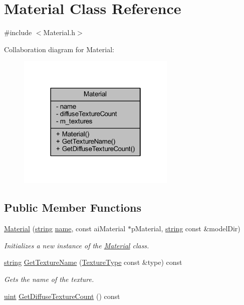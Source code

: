 \hypertarget{class_material}{}\section{Material Class Reference}
\label{class_material}


{\ttfamily \#include $<$Material.\+h$>$}



Collaboration diagram for Material\+:\nopagebreak
\begin{figure}[H]
\begin{center}
\leavevmode
\includegraphics[width=214pt]{class_material__coll__graph}
\end{center}
\end{figure}
\subsection*{Public Member Functions}
\begin{DoxyCompactItemize}
\item 
\hyperlink{class_material_a8c8ae5e51f629c7b991d7595d5cf6c32}{Material} (\hyperlink{_types_8h_ad453f9f71ce1f9153fb748d6bb25e454}{string} \hyperlink{class_material_a988570645fdd4363ca975f5bb4e47205}{name}, const ai\+Material $\ast$p\+Material, \hyperlink{_types_8h_ad453f9f71ce1f9153fb748d6bb25e454}{string} const \&model\+Dir)
\begin{DoxyCompactList}\small\item\em Initializes a new instance of the \hyperlink{class_material}{Material} class. \end{DoxyCompactList}\item 
\hyperlink{_types_8h_ad453f9f71ce1f9153fb748d6bb25e454}{string} \hyperlink{class_material_a75ffaeede8e8cd976e8be44185a97953}{Get\+Texture\+Name} (\hyperlink{_material_8h_a65468556d79304b3a4bfc464cc12e549}{Texture\+Type} const \&type) const 
\begin{DoxyCompactList}\small\item\em Gets the name of the texture. \end{DoxyCompactList}\item 
\hyperlink{_types_8h_a4f5fce8c1ef282264f9214809524d836}{uint} \hyperlink{class_material_a11e5c7f30a1b4aaf465eb611c4d2baa2}{Get\+Diffuse\+Texture\+Count} () const 
\end{DoxyCompactItemize}
